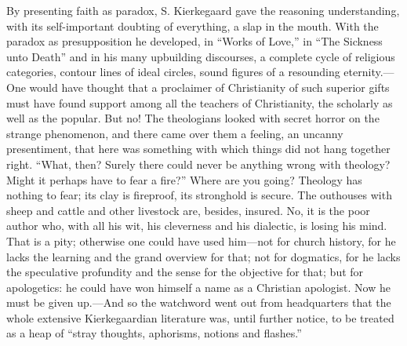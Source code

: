 \documentclass[12pt,a4paper,openany]{book}
\newcommand{\opage}[1]{\marginnote{\footnotesize\textit{[#1]}}}
\begin{document}
By presenting faith as paradox, S. Kierkegaard gave the reasoning
understanding, with its self-important doubting of everything, a slap in
the mouth. With the paradox as presupposition he developed, in
``Works of Love,'' in ``The Sickness unto Death'' and in his many
upbuilding discourses, a complete cycle of religious categories, contour
lines of ideal circles, sound figures of a resounding eternity.---One
would have thought that a \opage{62}proclaimer of Christianity of such superior
gifts must have found support among all the teachers of Christianity,
the scholarly as well as the popular. But no! The theologians looked with
secret horror on the strange phenomenon, and there came over them a
feeling, an uncanny presentiment, that here was something with which
things did not hang together right. ``What, then? Surely there could
never be anything wrong with theology? Might it perhaps have to fear a
fire?'' Where are you going? Theology has nothing to fear; its clay is
fireproof, its stronghold is secure. The outhouses with sheep and cattle
and other livestock are, besides, insured. No, it is the poor author who,
with all his wit, his cleverness and his dialectic, is losing his mind.
That is a pity; otherwise one could have used him---not for church
history, for he lacks the learning and the grand overview for that; not
for dogmatics, for he lacks the speculative profundity and the sense for
the objective for that; but for apologetics: he could have won himself a
name as a Christian apologist. Now he must be given up.---And so the
watchword went out from headquarters that the whole extensive
Kierkegaardian literature was, until further notice, to be treated as a
heap of ``stray thoughts, aphorisms, notions and flashes.''
\end{document}
